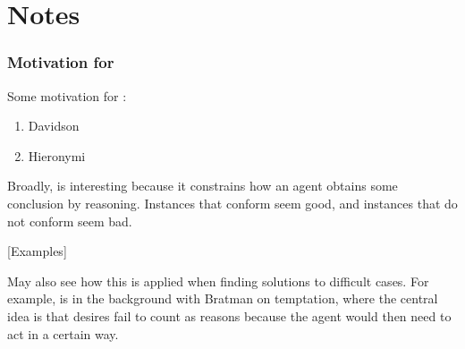 \chapter{Notes}
\label{cha:notes}

\subsection{Motivation for \ESU{}}
\label{sec:motiv-main-prem}

Some motivation for \ESU{}:

\begin{enumerate}
\item Davidson
\item Hieronymi
\end{enumerate}

Broadly, \ESU{} is interesting because it constrains how an agent obtains some conclusion by reasoning.
Instances that conform seem good, and instances that do not conform seem bad.

[Examples]

May also see how this is applied when finding solutions to difficult cases.
For example, \ESU{} is in the background with Bratman on temptation, where the central idea is that desires fail to count as reasons because the agent would then need to act in a certain way.

